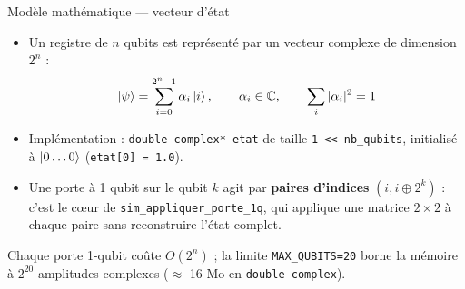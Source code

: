 \documentclass[10pt]{beamer}
\begin{document}
\begin{frame}{Modèle mathématique --- vecteur d'état}
  \begin{itemize}
    \item Un registre de $n$ qubits est représenté par un vecteur complexe de dimension $2^n$ :
    \[
      \ket{\psi} = \sum_{i=0}^{2^n-1} \alpha_i \ket{i}, \qquad \alpha_i \in \mathbb{C}, \qquad \sum_i |\alpha_i|^2 = 1
    \]
    \item Implémentation : \texttt{double complex* etat} de taille \texttt{1 << nb\_qubits}, initialisé à $\ket{0\ldots0}$ (\texttt{etat[0] = 1.0}).
    \item Une porte à 1 qubit sur le qubit $k$ agit par \textbf{paires d'indices} $(i, i \oplus 2^k)$ : c'est le c\oe ur de \texttt{sim\_appliquer\_porte\_1q}, qui applique une matrice $2\times2$ à chaque paire sans reconstruire l'état complet.
  \end{itemize}
  \begin{keybox}[title=Complexité]
    Chaque porte 1-qubit coûte $O(2^n)$ ; la limite \texttt{MAX\_QUBITS=20} borne la mémoire à $2^{20}$ amplitudes complexes ($\approx$ 16 Mo en \texttt{double complex}).
  \end{keybox}
\end{frame}
\end{document}
